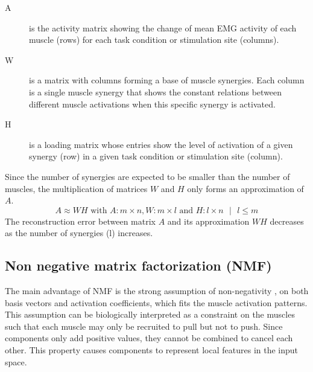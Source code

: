 \documentclass[a4paper]{article}
\begin{document}
\begin{description}
	\item[A] is the activity matrix showing the change of mean EMG activity of each muscle (rows) for each task condition or stimulation site (columns). 
	\item[W] is a matrix with columns forming a base of muscle synergies. Each column is a single muscle synergy that shows the constant relations between different muscle activations when this specific synergy is activated.
	\item[H] is a loading matrix whose entries show the level of activation of a given synergy (row) in a given task condition or stimulation site (column). 	
\end{description}
  
Since the number of synergies are expected to be smaller than the number of muscles, the multiplication of matrices $W$ and $H$ only forms an approximation of $A$.
\begin{equation}
	A \approx W H \text{ with } A: m \times n, W: m \times l \text{ and } H: l \times n \text{  } | \text{  } l \leq m
\end{equation}
The reconstruction error between matrix $A$ and its approximation $W H$ decreases as the number of synergies (l) increases.

\subsection{Non negative matrix factorization (NMF)} %
\label{sg:sub:nmf}

The main advantage of NMF is the strong assumption of non-negativity \cite{Lee:1999p1635}, on both basis vectors and activation coefficients, which fits the muscle activation patterns. This assumption can be biologically interpreted as a constraint on the muscles such that each muscle may only be recruited to pull but not to push. Since components only add positive values, they cannot be combined to cancel each other. This property causes components to represent local features in the input space.
\end{document}
